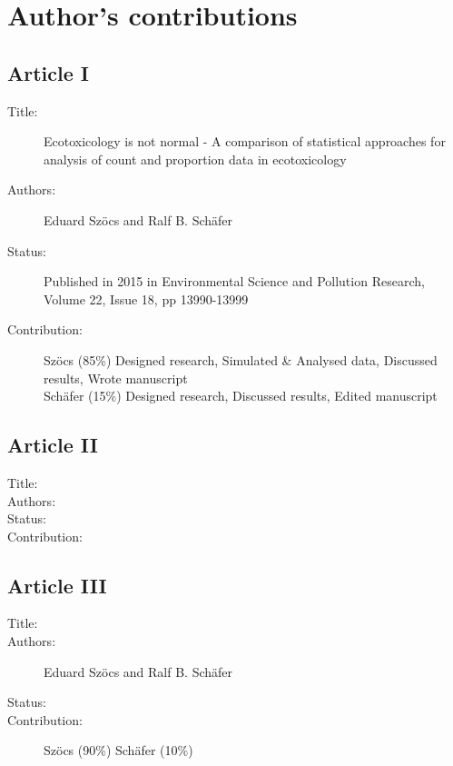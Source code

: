 \chapter{Author's contributions}

\section*{Article I}
\small
\begin{description}
	\item[Title:] Ecotoxicology is not normal - A comparison of statistical approaches for analysis of count and proportion data in ecotoxicology
	\item[Authors:] Eduard Szöcs and Ralf B. Schäfer
	\item[Status:] Published in 2015 in Environmental Science and Pollution Research, Volume 22, Issue 18, pp 13990-13999
	\item[Contribution:] Szöcs (85\%) Designed research, Simulated \& Analysed data, Discussed results, Wrote manuscript \\
	Schäfer (15\%) Designed research, Discussed results, Edited manuscript
\end{description}
\normalsize


\section*{Article II}
\small
\begin{description}
	\item[Title:] 
	\item[Authors:] 
	\item[Status:] 
	\item[Contribution:] 
\end{description}
\normalsize


\section*{Article III}
\small
\begin{description}
	\item[Title:] 
	\item[Authors:] Eduard Szöcs and Ralf B. Schäfer
	\item[Status:] 
	\item[Contribution:] Szöcs (90\%) 
	Schäfer (10\%) 
\end{description}
\normalsize


